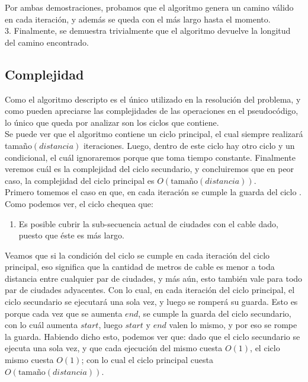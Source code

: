 \documentclass{article}
\theoremstyle{definition}
\theoremstyle{remark}
\begin{document}
Por ambas demostraciones, probamos que el algoritmo genera un camino válido en cada iteración, y además se queda con el más largo hasta el momento. \\

3. Finalmente, se demuestra trivialmente que el algoritmo devuelve la longitud del camino encontrado.


\subsection{Complejidad}
Como el algoritmo descripto es el único utilizado en la resolución del problema, y como pueden apreciarse las complejidades de las operaciones en el pseudocódigo, lo único que queda por analizar son los ciclos que contiene. \\
Se puede ver que el algoritmo contiene un ciclo principal, el cual siempre realizará tamaño$(distancia)$ iteraciones. Luego, dentro de este ciclo hay otro ciclo y un condicional, el cuál ignoraremos porque que toma tiempo constante. Finalmente veremos cuál es la complejidad del ciclo secundario, y concluiremos que en peor caso, la complejidad del ciclo principal es $O(\text{tamaño}(distancia))$. \\ 
Primero tomemos el caso en que, en cada iteración se cumple la guarda del ciclo .
Como podemos ver, el ciclo chequea que:
\begin{enumerate}
\item Es posible cubrir la sub-secuencia actual de ciudades con el cable dado, puesto que éste es más largo.
\end{enumerate}

Veamos que si la condición del ciclo se cumple en cada iteración del ciclo principal, eso significa que la cantidad de metros de cable es menor a toda distancia entre cualquier par de ciudades, y más aún, esto también vale para todo par de ciudades adyacentes. Con lo cual, en cada iteración del ciclo principal, el ciclo secundario se ejecutará una sola vez, y luego se romperá su guarda. Esto es porque cada vez que se aumenta $end$, se cumple la guarda del ciclo secundario, con lo cuál aumenta $start$, luego $start$ y $end$ valen lo mismo, y por eso se rompe la guarda. Habiendo dicho esto, podemos ver que: dado que el ciclo secundario se ejecuta una sola vez, y que cada ejecución del mismo cuesta $O(1)$, el ciclo mismo cuesta $O(1)$; con lo cual el ciclo principal cuesta $O(\text{tamaño}(distancia))$.
\end{document}
